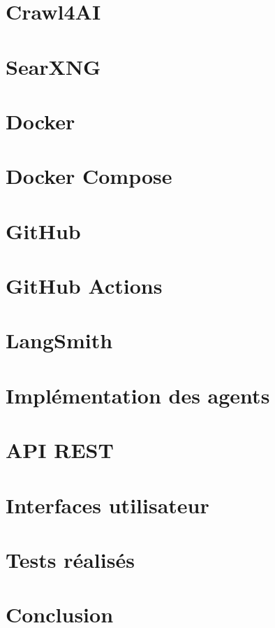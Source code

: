 \documentclass[12pt,a4paper,oneside]{report}
\begin{document}
\section{Crawl4AI}

\section{SearXNG}

\section{Docker}

\section{Docker Compose}

\section{GitHub}

\section{GitHub Actions}

\section{LangSmith}

\section{Implémentation des agents}

\section{API REST}

\section{Interfaces utilisateur}

\section{Tests réalisés}

\section{Conclusion}
\end{document}
